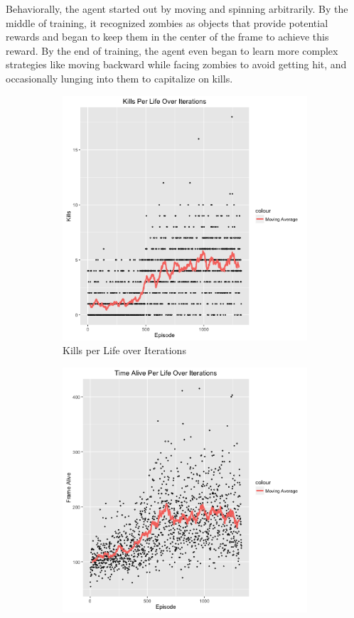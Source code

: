 \documentclass{article}
\begin{document}
\begin{multicols}{2}
Behaviorally, the agent started out by moving and spinning arbitrarily. By the middle of training, it recognized zombies as objects that provide potential rewards and began to keep them in the center of the frame to achieve this reward. By the end of training, the agent even began to learn more complex strategies like moving backward while facing zombies to avoid getting hit, and occasionally lunging into them to capitalize on kills.


\begin{figure}[H]
\captionsetup{justification=centering}
\caption{Results for Baseline}
\begin{subfigure}{.25\textwidth}
  \centering
  \includegraphics[scale=0.27]{./kills.png}
  \caption{Kills per Life over Iterations}
\end{subfigure}
\begin{subfigure}{.25\textwidth}
  \centering
  \includegraphics[scale=0.27]{./time.png}

\end{subfigure}
\end{figure}
\end{multicols}
\end{document}
